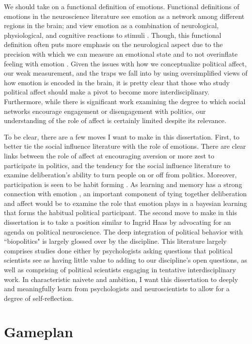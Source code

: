 \documentclass[12pt]{article}
\begin{document}
We should take on a functional definition of emotions. Functional definitions of emotions in the neuroscience literature see emotion as a network among different regions in the brain; and view emotion as a combination of neurological, physiological, and cognitive reactions to stimuli \citep{ralph_anderson_2018}. Though, this functional definition often puts more emphasis on the neurological aspect due to the precision with which we can measure an emotional state and to not overinflate feeling with emotion \citep{ralph_anderson_2018}. Given the issues with how we conceptualize political affect, our weak measurement, and the traps we fall into by using oversimplified views of how emotion is encoded in the brain, it is pretty clear that those who study political affect should make a pivot to become more interdisciplinary. Furthermore, while there is significant work examining the degree to which social networks encourage engagement or disengagement with politics, our understanding of the role of affect is certainly limited despite its relevance.

To be clear, there are a few moves I want to make in this dissertation. First, to better tie the social influence literature with the role of emotions. There are clear links between the role of affect at encouraging aversion or more zest to participate in politics, and the tendency for the social influence literature to examine deliberation's ability to turn people on or off from politics. Moreover, participation is seen to be habit forming \citep{verba_et-al_1995}. As learning and memory has a strong connection with emotion \citep{ralph_anderson_2018}, an important component of tying together deliberation and affect would be to examine the role that emotion plays in a bayesian learning that forms the habitual political participant. The second move to make in this dissertation is to take a position similar to Ingrid Haas by advocating for an agenda on political neuroscience. The deep integration of political behavior with ``biopolitics" is largely glossed over by the discipline. This literature largely comprises studies done either by psychologists asking questions that political scientists see as having little value to adding to our discipline's open questions, as well as comprising of political scientists engaging in tentative interdisciplinary work. In characteristic naivete and ambition, I want this dissertation to deeply and meaningfully learn from psychologists and neuroscientists to allow for a degree of self-reflection.

\section{Gameplan}
\end{document}
